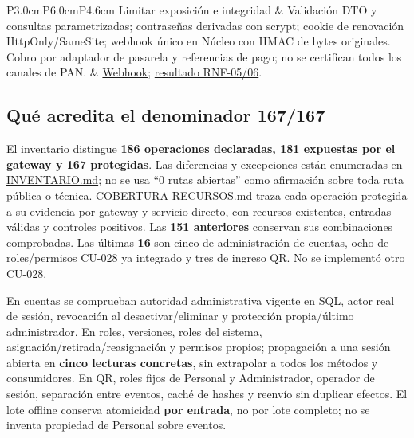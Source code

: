 \begin{center}
\begin{longtable}{P{3.0cm}P{6.0cm}P{4.6cm}}
\midrule
Limitar exposición e integridad & Validación DTO y consultas parametrizadas;
contraseñas derivadas con scrypt; cookie de renovación HttpOnly/SameSite;
webhook único en Núcleo con HMAC de bytes originales. Cobro por adaptador de
pasarela y referencias de pago; no se certifican todos los canales de PAN. &
\href{https://github.com/Emperador24/HEXACORE/blob/9bc1ee5/App/backend/apps/nucleo/pagos/webhook.controller.ts}{Webhook};
\href{https://github.com/Emperador24/HEXACORE/blob/9bc1ee5/App/infra/informe-atributos/seguridad/RESULTADO.md}{resultado RNF-05/06}.\\
\bottomrule
\caption{Defensa en profundidad vigente; una guarda de rol no reemplaza las reglas del recurso.}
\end{longtable}
\end{center}

\subsection{Qué acredita el denominador 167/167}
El inventario distingue \textbf{186 operaciones declaradas, 181 expuestas por el
gateway y 167 protegidas}. Las diferencias y excepciones están enumeradas en
\href{https://github.com/Emperador24/HEXACORE/blob/main/App/infra/informe-atributos/seguridad/INVENTARIO.md}{INVENTARIO.md};
no se usa ``0 rutas abiertas'' como afirmación sobre toda ruta pública o técnica.
\href{https://github.com/Emperador24/HEXACORE/blob/9bc1ee5/App/infra/informe-atributos/seguridad/COBERTURA-RECURSOS.md}{COBERTURA-RECURSOS.md}
traza cada operación protegida a su evidencia por gateway y servicio directo,
con recursos existentes, entradas válidas y controles positivos. Las
\textbf{151 anteriores} conservan sus combinaciones comprobadas. Las últimas
\textbf{16} son cinco de administración de cuentas, ocho de roles/permisos
CU-028 ya integrado y tres de ingreso QR. No se implementó otro CU-028.

En cuentas se comprueban autoridad administrativa vigente en SQL, actor real de
sesión, revocación al desactivar/eliminar y protección propia/último administrador.
En roles, versiones, roles del sistema, asignación/retirada/reasignación y permisos
propios; propagación a una sesión abierta en \textbf{cinco lecturas concretas},
sin extrapolar a todos los métodos y consumidores. En QR, roles fijos de Personal
y Administrador, operador de sesión, separación entre eventos, caché de hashes
y reenvío sin duplicar efectos. El lote offline conserva atomicidad
\textbf{por entrada}, no por lote completo; no se inventa propiedad de Personal
sobre eventos.


